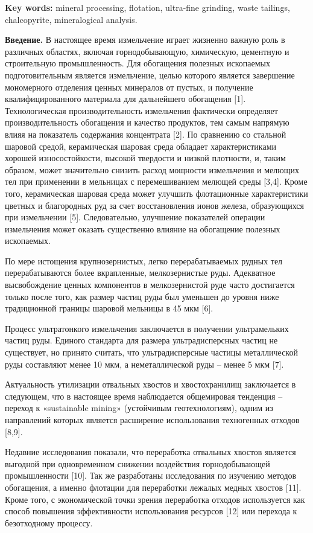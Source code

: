 {\bfseries Key words:} mineral processing, flotation, ultra-fine grinding,
waste tailings, chalcopyrite, mineralogical analysis.

{\bfseries Введение.} В настоящее время измельчение играет жизненно важную
роль в различных областях, включая горнодобывающую, химическую,
цементную и строительную промышленность. Для обогащения полезных
ископаемых подготовительным является измельчение, целью которого
является завершение мономерного отделения ценных минералов от пустых, и
получение квалифицированного материала для дальнейшего обогащения
{[}1{]}. Технологическая производительность измельчения фактически
определяет производительность обогащения и качество продуктов, тем самым
напрямую влияя на показатель содержания концентрата {[}2{]}. По
сравнению со стальной шаровой средой, керамическая шаровая среда
обладает характеристиками хорошей износостойкости, высокой твердости и
низкой плотности, и, таким образом, может значительно снизить расход
мощности измельчения и мелющих тел при применении в мельницах с
перемешиванием мелющей среды {[}3,4{]}. Кроме того, керамическая шаровая
среда может улучшить флотационные характеристики цветных и благородных
руд за счет восстановления ионов железа, образующихся при измельчении
{[}5{]}. Следовательно, улучшение показателей операции измельчения может
оказать существенно влияние на обогащение полезных ископаемых.

По мере истощения крупнозернистых, легко перерабатываемых рудных тел
перерабатываются более вкрапленные, мелкозернистые руды. Адекватное
высвобождение ценных компонентов в мелкозернистой руде часто достигается
только после того, как размер частиц руды был уменьшен до уровня ниже
традиционной границы шаровой мельницы в 45 мкм {[}6{]}.

Процесс ультратонкого измельчения заключается в получении ультрамельких
частиц руды. Единого стандарта для размера ультрадисперсных частиц не
существует, но принято считать, что ультрадисперсные частицы
металлической руды составляют менее 10 мкм, а неметаллической руды --
менее 5 мкм {[}7{]}.

Актуальность утилизации отвальных хвостов и хвостохранилищ заключается в
следующем, что в настоящее время наблюдается общемировая тенденция --
переход к «sustainable mining» (устойчивым геотехнологиям), одним из
направлений которых является расширение использования техногенных
отходов {[}8,9{]}.

Недавние исследования показали, что переработка отвальных хвостов
является выгодной при одновременном снижении воздействия горнодобывающей
промышленности {[}10{]}. Так же разработаны исследования по изучению
методов обогащения, а именно флотации для переработки лежалых медных
хвостов {[}11{]}. Кроме того, с экономической точки зрения переработка
отходов используется как способ повышения эффективности использования
ресурсов {[}12{]} или перехода к безотходному процессу.

